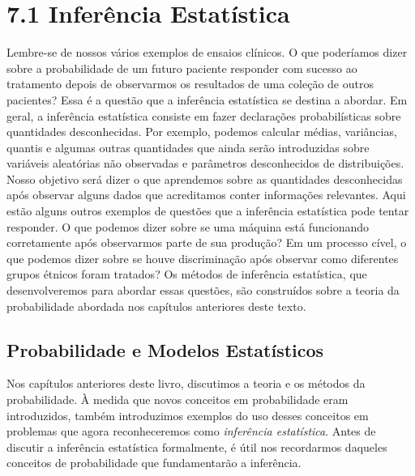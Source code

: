 \section*{7.1 Inferência Estatística}

Lembre-se de nossos vários exemplos de ensaios clínicos. O que poderíamos dizer sobre a probabilidade de um futuro paciente responder com sucesso ao tratamento depois de observarmos os resultados de uma coleção de outros pacientes? Essa é a questão que a inferência estatística se destina a abordar. Em geral, a inferência estatística consiste em fazer declarações probabilísticas sobre quantidades desconhecidas. Por exemplo, podemos calcular médias, variâncias, quantis e algumas outras quantidades que ainda serão introduzidas sobre variáveis aleatórias não observadas e parâmetros desconhecidos de distribuições. Nosso objetivo será dizer o que aprendemos sobre as quantidades desconhecidas após observar alguns dados que acreditamos conter informações relevantes. Aqui estão alguns outros exemplos de questões que a inferência estatística pode tentar responder. O que podemos dizer sobre se uma máquina está funcionando corretamente após observarmos parte de sua produção? Em um processo cível, o que podemos dizer sobre se houve discriminação após observar como diferentes grupos étnicos foram tratados? Os métodos de inferência estatística, que desenvolveremos para abordar essas questões, são construídos sobre a teoria da probabilidade abordada nos capítulos anteriores deste texto.

\subsection*{Probabilidade e Modelos Estatísticos}

Nos capítulos anteriores deste livro, discutimos a teoria e os métodos da probabilidade. À medida que novos conceitos em probabilidade eram introduzidos, também introduzimos exemplos do uso desses conceitos em problemas que agora reconheceremos como \textit{inferência estatística}. Antes de discutir a inferência estatística formalmente, é útil nos recordarmos daqueles conceitos de probabilidade que fundamentarão a inferência.

\vspace{1cm} %

